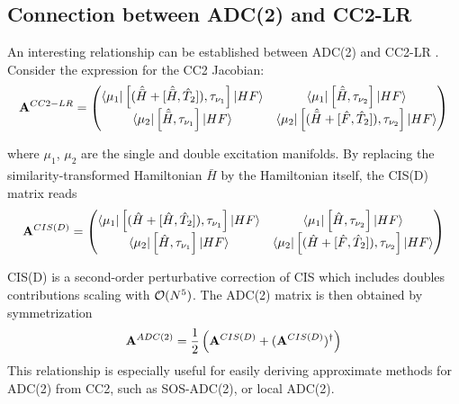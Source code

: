 
\subsection{Connection between ADC(2) and CC2-LR} 

An interesting relationship can be established between ADC(2) and CC2-LR \cite{Hf2005}. Consider the expression for the CC2 Jacobian:
\begin{equation}
\mathbf{A}^{CC2-LR} = \left( \begin{matrix}
\bra{\smash{\mu_1}} \left[ (\hat{\bar{H}} + \left[ \smash{ \hat{\bar{H}},\hat{T}_2} \right]), \tau_{\nu_1} \right] \ket{\smash{HF}} &  \bra{\smash{\mu_1}} \left[ \hat{\bar{H}}, \tau_{\nu_2} \right] \ket{\smash{HF}} \\
\bra{\smash{\mu_2}} \left[ \hat{\bar{H}}, \tau_{\nu_1} \right] \ket{\smash{HF}} & \bra{\smash{\mu_2}} \left[ (\hat{\bar{H}} + \left[ \smash{ \hat{F},\hat{T}_2} \right]), \tau_{\nu_2} \right] \ket{\smash{HF}}
\end{matrix}
\right)
\end{equation}

\noindent where $\mu_1$, $\mu_2$ are the single and double excitation manifolds. By replacing the similarity-transformed Hamiltonian $\hat{\bar{H}}$ by the Hamiltonian itself, the CIS(D) matrix reads
\begin{equation}
\mathbf{A}^{CIS(D)} = \left( \begin{matrix}
\bra{\smash{\mu_1}} \left[ (\hat{H} + \left[ \smash{ \hat{H},\hat{T}_2} \right]), \tau_{\nu_1} \right] \ket{\smash{HF}} &  \bra{\smash{\mu_1}} \left[ \hat{H}, \tau_{\nu_2} \right] \ket{\smash{HF}} \\
\bra{\smash{\mu_2}} \left[ \hat{H}, \tau_{\nu_1} \right] \ket{\smash{HF}} & \bra{\smash{\mu_2}} \left[ (\hat{H} + \left[ \smash{ \hat{F},\hat{T}_2} \right]), \tau_{\nu_2} \right] \ket{\smash{HF}}
\end{matrix}
\right)
\end{equation}

\noindent CIS(D) is a second-order perturbative correction of CIS which includes doubles contributions \cite{Hea1994} scaling with $\mathcal{O}(N^{5})$. The ADC(2) matrix is then obtained by symmetrization
\begin{equation}
\mathbf{A}^{ADC(2)} = \frac{1}{2} \left(\mathbf{A}^{CIS(D)} + (\mathbf{A}^{CIS(D)})^{\dagger} \right)
\end{equation}
\noindent This relationship is especially useful for easily deriving approximate methods for ADC(2) from CC2, such as SOS-ADC(2), or local ADC(2).

